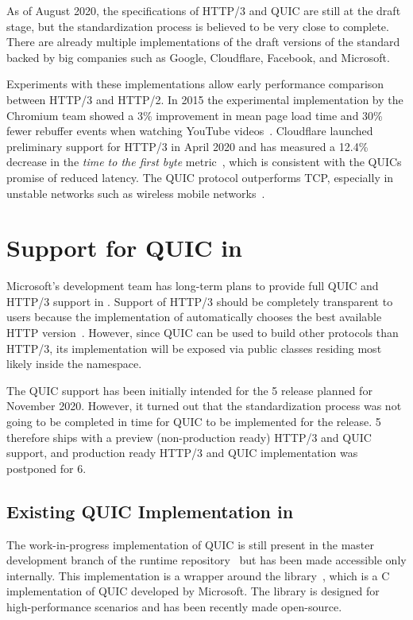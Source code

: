 As of August 2020, the specifications of HTTP/3 and QUIC are still at the draft stage, but the
standardization process is believed to be very close to complete. There are already multiple
implementations of the draft versions of the standard backed by big companies such as Google,
Cloudflare, Facebook, and Microsoft.

Experiments with these implementations allow early performance comparison between HTTP/3 and HTTP/2.
In 2015 the experimental implementation by the Chromium team showed a 3\% improvement in mean page
load time and 30\% fewer rebuffer events when watching YouTube videos~\cite{Wilk2015}. Cloudflare
launched preliminary support for HTTP/3 in April 2020 and has measured a 12.4\% decrease in the
\textit{time to the first byte} metric~\cite{Tellakula2020}, which is consistent with the QUICs
promise of reduced latency. The QUIC protocol outperforms TCP, especially in unstable networks such
as wireless mobile networks~\cite{Cook2017}.

\section{Support for QUIC in \dotnet{}}

Microsoft's \dotnet{} development team has long-term plans to provide full QUIC and HTTP/3 support
in \dotnet{}. Support of HTTP/3 should be completely transparent to users because the implementation
of  automatically chooses the best available HTTP version~\cite{HttpClientDocs}.
However, since QUIC can be used to build other protocols than HTTP/3, its implementation will be
exposed via public classes residing most likely inside the  namespace.

The QUIC support has been initially intended for the \dotnet{} 5 release planned for November 2020.
However, it turned out that the standardization process was not going to be completed in time for
QUIC to be implemented for the release. \dotnet{} 5 therefore ships with a preview (non-production
ready) HTTP/3 and QUIC support, and production ready HTTP/3 and QUIC implementation was postponed
for \dotnet{} 6.

\subsection*{Existing QUIC Implementation in \dotnet{}}

The work-in-progress implementation of QUIC is still present in the master development branch of the
\dotnet{} runtime repository~\cite{dotnetGithub} but has been made accessible only internally. This
implementation is a wrapper around the \libmsquic{} library~\cite{msquicGithub}, which is a C
implementation of QUIC developed by Microsoft. The \libmsquic{} library is designed for
high-performance scenarios and has been recently made open-source.

